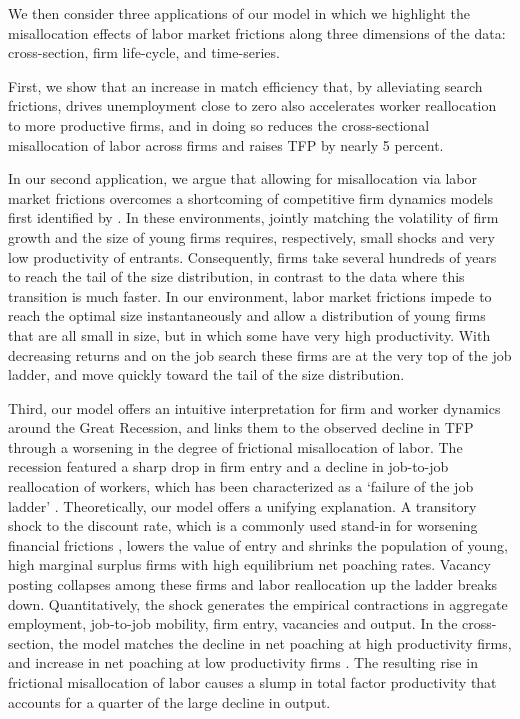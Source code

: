 We then consider three applications of our model in which we highlight the misallocation effects of labor market frictions along three dimensions of the data: cross-section, firm life-cycle, and time-series.

First, we show that an increase in match efficiency that, by alleviating search frictions, drives unemployment close to zero also accelerates worker reallocation to more productive firms, and in doing so reduces the cross-sectional misallocation of labor across firms and raises TFP by nearly 5 percent.

In our second application, we argue that allowing for misallocation via labor market frictions overcomes a shortcoming of competitive firm dynamics models first identified by \cite{luttmer2011}.
In these environments, jointly matching the volatility of firm growth and the size of young firms requires, respectively,  small shocks and very low productivity of entrants.
Consequently, firms take several hundreds of years to reach the tail of the size distribution, in contrast to the data where this transition is much faster.
In our environment, labor market frictions impede to reach the optimal size instantaneously and allow a distribution of young firms that are all small in size, but in which some have very high productivity. With decreasing returns and on the job search these firms are at the very top of the job ladder, and move quickly toward the tail of the size distribution.

Third, our model offers an intuitive interpretation for firm and worker dynamics around the Great Recession, and links them to the observed decline in TFP through a worsening in the degree of frictional misallocation of labor.
The recession featured a sharp drop in firm entry and a decline in job-to-job reallocation of workers, which has been characterized as a `failure of the job ladder' \citep{Siemer,moscapv}.
Theoretically, our model offers a unifying explanation.
A transitory shock to the discount rate, which is a commonly used stand-in for worsening financial frictions \citep{hall2017high}, lowers the value of entry and shrinks the population of young, high marginal surplus firms with high equilibrium net poaching rates.
Vacancy posting collapses among these firms and labor reallocation up the ladder breaks down.
Quantitatively, the shock generates the empirical contractions in aggregate employment, job-to-job mobility, firm entry, vacancies and output.
In the cross-section, the model matches the decline in net poaching at high productivity firms, and increase in net poaching at low productivity firms \citep{haltiwanger2021}.
The resulting rise in frictional misallocation of labor causes a slump in total factor productivity that accounts for a quarter of the large decline in output.


